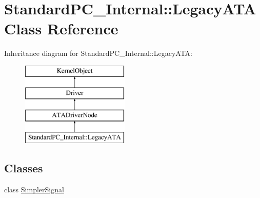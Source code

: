 \hypertarget{class_standard_p_c___internal_1_1_legacy_a_t_a}{}\section{Standard\+P\+C\+\_\+\+Internal\+:\+:Legacy\+A\+TA Class Reference}
\label{class_standard_p_c___internal_1_1_legacy_a_t_a}
Inheritance diagram for Standard\+P\+C\+\_\+\+Internal\+:\+:Legacy\+A\+TA\+:\begin{figure}[H]
\begin{center}
\leavevmode
\includegraphics[height=4.000000cm]{class_standard_p_c___internal_1_1_legacy_a_t_a}
\end{center}
\end{figure}
\subsection*{Classes}
\begin{DoxyCompactItemize}
\item 
class \hyperlink{class_standard_p_c___internal_1_1_legacy_a_t_a_1_1_simpler_signal}{Simpler\+Signal}
\end{DoxyCompactItemize}
